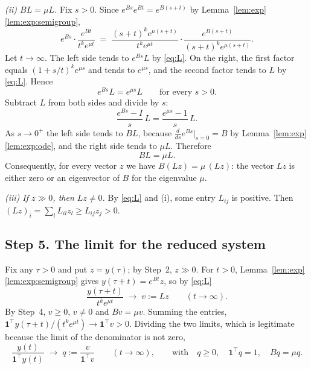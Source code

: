 \documentclass[11pt]{article}
\theoremstyle{definition}
\theoremstyle{remark}
\newcommand{\one}{\mathbf{1}}
\newcommand{\T}{\top}
\begin{document}
\emph{\textup{(ii)} $BL = \mu L$.} Fix $s > 0$. Since $e^{Bs} e^{Bt} = e^{B(s+t)}$ by
Lemma~\ref{lem:exp}\ref{lem:exp:semigroup},
\[
  e^{Bs} \cdot \frac{e^{Bt}}{t^{k} e^{\mu t}}
  \;=\;
  \frac{(s+t)^{k} e^{\mu(s+t)}}{t^{k} e^{\mu t}}
  \cdot
  \frac{e^{B(s+t)}}{(s+t)^{k} e^{\mu(s+t)}} .
\]
Let $t \to \infty$. The left side tends to $e^{Bs} L$ by \eqref{eq:L}. On the right, the first
factor equals $(1 + s/t)^{k} e^{\mu s}$ and tends to $e^{\mu s}$, and the second factor tends to
$L$ by \eqref{eq:L}. Hence
\begin{equation}\label{eq:semigroup}
  e^{Bs} L = e^{\mu s} L \qquad \text{for every } s > 0 .
\end{equation}
Subtract $L$ from both sides and divide by $s$:
\[
  \frac{e^{Bs} - I}{s}\, L = \frac{e^{\mu s} - 1}{s}\, L .
\]
As $s \to 0^{+}$ the left side tends to $BL$, because
$\frac{d}{ds} e^{Bs} \big|_{s=0} = B$ by Lemma~\ref{lem:exp}\ref{lem:exp:ode}, and the right side
tends to $\mu L$. Therefore
\begin{equation}\label{eq:eig}
  BL = \mu L .
\end{equation}
Consequently, for every vector $z$ we have $B(Lz) = \mu\,(Lz)$: the vector $Lz$ is either zero or
an eigenvector of $B$ for the eigenvalue $\mu$.

\emph{\textup{(iii)} If $z \gg 0$, then $Lz \ne 0$.} By \eqref{eq:L} and (i), some entry $L_{ij}$
is positive. Then $(Lz)_i = \sum_{l} L_{il} z_l \ge L_{ij} z_j > 0$.

\subsection*{Step 5. The limit for the reduced system}

Fix any $\tau > 0$ and put $z = y(\tau)$; by Step~2, $z \gg 0$. For $t > 0$,
Lemma~\ref{lem:exp}\ref{lem:exp:semigroup} gives $y(\tau + t) = e^{Bt} z$, so by \eqref{eq:L}
\[
  \frac{y(\tau + t)}{t^{k} e^{\mu t}} \;\longrightarrow\; v := Lz
  \qquad (t \to \infty).
\]
By Step~4, $v \ge 0$, $v \ne 0$ and $Bv = \mu v$. Summing the entries,
$\one^\T y(\tau + t) / (t^{k} e^{\mu t}) \to \one^\T v > 0$. Dividing the two limits, which is
legitimate because the limit of the denominator is not zero,
\begin{equation}\label{eq:q}
  \frac{y(t)}{\one^\T y(t)} \;\longrightarrow\; q := \frac{v}{\one^\T v}
  \qquad (t \to \infty),
  \qquad\text{with}\quad q \ge 0, \quad \one^\T q = 1, \quad Bq = \mu q .
\end{equation}
\end{document}
